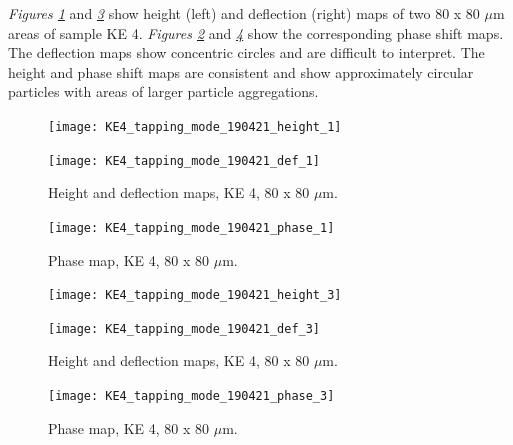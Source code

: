 
\textit{Figures \ref{fig:afm_ke4_height_def_1}} and \textit{\ref{fig:afm_ke4_height_def_2}} show height (left) and deflection (right) maps of two 80 x 80 $\mu$m areas of sample KE 4. \textit{Figures \ref{fig:afm_ke4_phase_1}} and \textit{\ref{fig:afm_ke4_phase_2}} show the corresponding phase shift maps. The deflection maps show concentric circles and are difficult to interpret. The height and phase shift maps are consistent and show approximately circular particles with areas of larger particle aggregations. 

\begin{figure}[H]
\centering
\begin{minipage}{.45\textwidth}
  \centering
  \texttt{[image: KE4\_tapping\_mode\_190421\_height\_1]}
\end{minipage}
\begin{minipage}{.45\textwidth}
  \centering
  \texttt{[image: KE4\_tapping\_mode\_190421\_def\_1]}
\end{minipage}
\caption[Height and deflection maps, KE 4]{Height and deflection maps, KE 4, 80 x 80 $\mu$m.}
\label{fig:afm_ke4_height_def_1}
\end{figure}

\begin{figure}[H]
\centering
  \texttt{[image: KE4\_tapping\_mode\_190421\_phase\_1]}
\caption[Phase map, KE 4]{Phase map, KE 4, 80 x 80 $\mu$m.}
\label{fig:afm_ke4_phase_1}
\end{figure}

\begin{figure}[H]
\centering
\begin{minipage}{.45\textwidth}
  \centering
  \texttt{[image: KE4\_tapping\_mode\_190421\_height\_3]}
\end{minipage}
\begin{minipage}{.45\textwidth}
  \centering
  \texttt{[image: KE4\_tapping\_mode\_190421\_def\_3]}
\end{minipage}
\caption[Height and deflection maps, KE 4]{Height and deflection maps, KE 4, 80 x 80 $\mu$m.}
\label{fig:afm_ke4_height_def_2}
\end{figure}

\begin{figure}[H]
\centering
  \texttt{[image: KE4\_tapping\_mode\_190421\_phase\_3]}
\caption[Phase map, KE 4]{Phase map, KE 4, 80 x 80 $\mu$m.}
\label{fig:afm_ke4_phase_2}
\end{figure}


